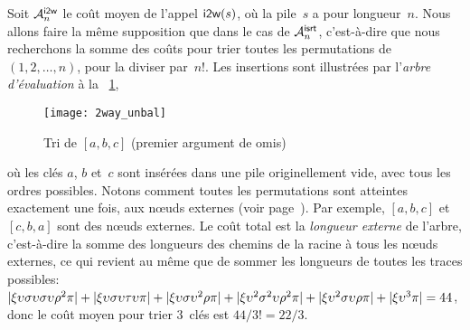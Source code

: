 Soit \(\M{\fun{i2w}}{n}\) le coût moyen
de l'appel \(\fun{i2w}(s)\), où la pile~\(s\) a
pour longueur~\(n\). Nous allons faire la même supposition que dans le
cas de \(\M{\fun{isrt}}{n}\), c'est-à-dire que nous recherchons la
somme des coûts pour trier toutes les permutations de
\((1,2,\dots,n)\), pour la diviser par~\(n!\). Les insertions sont
illustrées par l'\emph{arbre d'évaluation} à la \fig~\ref{fig:2way_unbal},
\begin{figure}[!b]
\centering
\texttt{[image: 2way\_unbal]}
\caption{Tri de \([a,b,c]\) (premier argument de  omis)}
\label{fig:2way_unbal}
\end{figure}
où les clés \(a\), \(b\) et~\(c\) sont insérées dans une pile
originellement vide, avec tous les ordres possibles. Notons comment
toutes les permutations sont atteintes exactement une fois, aux
nœuds externes (voir
page~\pageref{def:external_node}). Par exemple, \([a,b,c]\) et
\([c,b,a]\) sont des nœuds externes. Le coût total est la
\emph{longueur externe}\label{external_path_length} de l'arbre, c'est-à-dire la
somme des longueurs des chemins de la racine à tous les nœuds
externes, ce qui revient au même que de sommer les longueurs de toutes
les traces possibles:
\(\len{\xi\upsilon\sigma\upsilon\sigma\upsilon\rho^2\pi} +
\len{\xi\upsilon\sigma\upsilon\tau\upsilon\pi} +
\len{\xi\upsilon\sigma\upsilon^2\rho\pi} +
\len{\xi\upsilon^2\sigma^2\upsilon\rho^2\pi} +
\len{\xi\upsilon^2\sigma\upsilon\rho\pi} + \len{\xi\upsilon^3\pi} =
44\), donc le coût moyen pour trier \(3\)~clés est \(44/3! = 22/3\).

